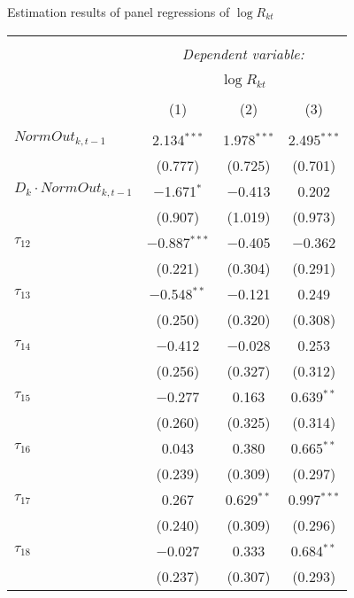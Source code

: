   \caption{Estimation results of panel regressions of $\log R_{kt}$} 
  \label{} 
\small 
\begin{tabular}{@{\extracolsep{5pt}}lccc} 
\\[-1.8ex]\hline 
\hline \\[-1.8ex] 
 & \multicolumn{3}{c}{\textit{Dependent variable:}} \\ 
\cline{2-4} 
\\[-1.8ex] & \multicolumn{3}{c}{$\log R_{kt}$} \\ 
\\[-1.8ex] & (1) & (2) & (3)\\ 
\hline \\[-1.8ex] 
 $NormOut_{k,t-1}$ & 2.134$^{***}$ & 1.978$^{***}$ & 2.495$^{***}$ \\ 
  & (0.777) & (0.725) & (0.701) \\ 
  
  $D_k\cdot NormOut_{k,t-1}$ & $-$1.671$^{*}$ & $-$0.413 & 0.202 \\ 
  & (0.907) & (1.019) & (0.973) \\ 
   
 $\tau_{12}$ & $-$0.887$^{***}$ & $-$0.405 & $-$0.362 \\ 
  & (0.221) & (0.304) & (0.291) \\ 
   
 $\tau_{13}$ & $-$0.548$^{**}$ & $-$0.121 & 0.249 \\ 
  & (0.250) & (0.320) & (0.308) \\ 
   
 $\tau_{14}$ & $-$0.412 & $-$0.028 & 0.253 \\ 
  & (0.256) & (0.327) & (0.312) \\ 
   
 $\tau_{15}$ & $-$0.277 & 0.163 & 0.639$^{**}$ \\ 
  & (0.260) & (0.325) & (0.314) \\ 
   
 $\tau_{16}$ & 0.043 & 0.380 & 0.665$^{**}$ \\ 
  & (0.239) & (0.309) & (0.297) \\ 
   
 $\tau_{17}$ & 0.267 & 0.629$^{**}$ & 0.997$^{***}$ \\ 
  & (0.240) & (0.309) & (0.296) \\ 
   
 $\tau_{18}$ & $-$0.027 & 0.333 & 0.684$^{**}$ \\ 
  & (0.237) & (0.307) & (0.293) \\ 
   

\end{tabular}
